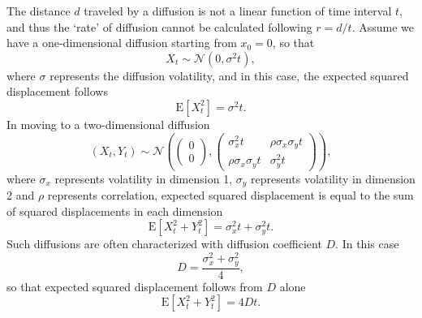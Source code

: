 \documentclass[11pt,oneside,letterpaper]{article}
\newcommand{\normal}{\mathcal{N}}					%
\newcommand{\twomatrix}[2]{\left( \begin{matrix} #1 \\ #2 \end{matrix} \right)}								%
\newcommand{\fourmatrix}[4]{\left( \begin{matrix} #1 & #2 \\ #3 & #4 \end{matrix} \right)}					%
\begin{document}
The distance $d$ traveled by a diffusion is not a linear function of time interval $t$, and thus the `rate' of diffusion cannot be calculated following $r=d/t$.
Assume we have a one-dimensional diffusion starting from $x_0 = 0$, so that
\begin{equation}
	X_t \sim \normal(0, \sigma^2 t),
\end{equation}
where $\sigma$ represents the diffusion volatility, and in this case, the expected squared displacement follows
\begin{equation}
	\mathrm{E}[X_t^2] = \sigma^2 t.
\end{equation}
In moving to a two-dimensional diffusion
\begin{equation}
	(X_t, Y_t) \sim \normal \left( \twomatrix{0}{0}, \fourmatrix{\sigma_x^2 t}{\rho \sigma_x \sigma_y t}{\rho \sigma_x \sigma_y t}{\sigma_y^2 t} \right),
\end{equation}
where $\sigma_x$ represents volatility in dimension 1, $\sigma_y$ represents volatility in dimension 2 and $\rho$ represents correlation,   expected squared displacement is equal to the sum of squared displacements in each dimension
\begin{equation}
	\mathrm{E}[X_t^2 + Y_t^2] = \sigma_x^2 t + \sigma_y^2 t.
\end{equation}
Such diffusions are often characterized with diffusion coefficient $D$.
In this case
\begin{equation}
	D = \frac{\sigma_x^2 + \sigma_y^2}{4},
\end{equation}
so that expected squared displacement follows from $D$ alone
\begin{equation}
	\mathrm{E}[X_t^2 + Y_t^2] = 4 D t.
\end{equation}
\end{document}
